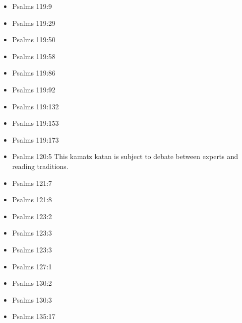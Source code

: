 \documentclass[14pt]{article}
\begin{document}
\begin{multicols}{2}
\begin{itemize}
							\item Psalms 119:9
							
							\item Psalms 119:29
							
							\item Psalms 119:50
							
							\item Psalms 119:58
							
							\item Psalms 119:86
							
							\item Psalms 119:92
							
							\item Psalms 119:132
							
							\item Psalms 119:153
							
							\item Psalms 119:173
							
							\item Psalms 120:5 This kamatz katan is subject to debate between experts and reading traditions.
							
							\item Psalms 121:7
							
							\item Psalms 121:8
							
							\item Psalms 123:2
							
							\item Psalms 123:3
							
							\item Psalms 123:3
							
							\item Psalms 127:1
							
							\item Psalms 130:2
							
							\item Psalms 130:3
							
							\item Psalms 135:17
							

\end{itemize}
\end{multicols}
\end{document}
